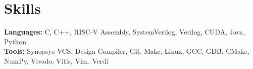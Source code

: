 \documentclass[11pt]{article} %
\begin{document}

\vspace{-18.5pt}

\section*{Skills}
\textbf{Languages:} C, C++, RISC-V Assembly, SystemVerilog, Verilog, CUDA, Java, Python \\
\textbf{Tools:} Synopsys VCS, Design Compiler, Git, Make, Linux, GCC, GDB, CMake, NumPy, Vivado, Vitis, Vim, Verdi
\end{document}
